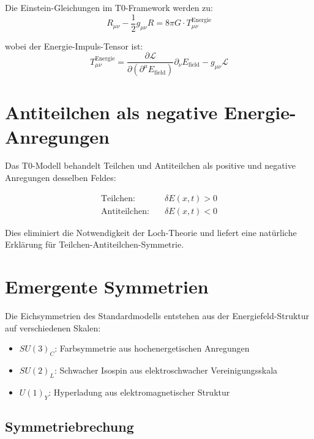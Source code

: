 \documentclass[12pt,a4paper]{report}
\begin{document}
	Die Einstein-Gleichungen im T0-Framework werden zu:
	\begin{equation}
		R_{\mu\nu} - \frac{1}{2}g_{\mu\nu}R = 8\pi G \cdot T_{\mu\nu}^{\text{Energie}}
	\end{equation}
	
	wobei der Energie-Impuls-Tensor ist:
	\begin{equation}
		T_{\mu\nu}^{\text{Energie}} = \frac{\partial \mathcal{L}}{\partial (\partial^\mu E_{\text{field}})} \partial_\nu E_{\text{field}} - g_{\mu\nu} \mathcal{L}
	\end{equation}
	
	\section{Antiteilchen als negative Energie-Anregungen}
	\label{sec:antiparticles_negative_energy}
	
	Das T0-Modell behandelt Teilchen und Antiteilchen als positive und negative Anregungen desselben Feldes:
	
	\begin{align}
		\text{Teilchen:} \quad &\delta E(x,t) > 0 \\
		\text{Antiteilchen:} \quad &\delta E(x,t) < 0
	\end{align}
	
	Dies eliminiert die Notwendigkeit der Loch-Theorie und liefert eine natürliche Erklärung für Teilchen-Antiteilchen-Symmetrie.
	
	\section{Emergente Symmetrien}
	\label{sec:emergent_symmetries}
	
	Die Eichsymmetrien des Standardmodells entstehen aus der Energiefeld-Struktur auf verschiedenen Skalen:
	
	\begin{itemize}
		\item \textbf{$SU(3)_C$}: Farbsymmetrie aus hochenergetischen Anregungen
		\item \textbf{$SU(2)_L$}: Schwacher Isospin aus elektroschwacher Vereinigungsskala
		\item \textbf{$U(1)_Y$}: Hyperladung aus elektromagnetischer Struktur
	\end{itemize}
	
	\subsection{Symmetriebrechung}
	\label{subsec:symmetry_breaking}
	
\end{document}
